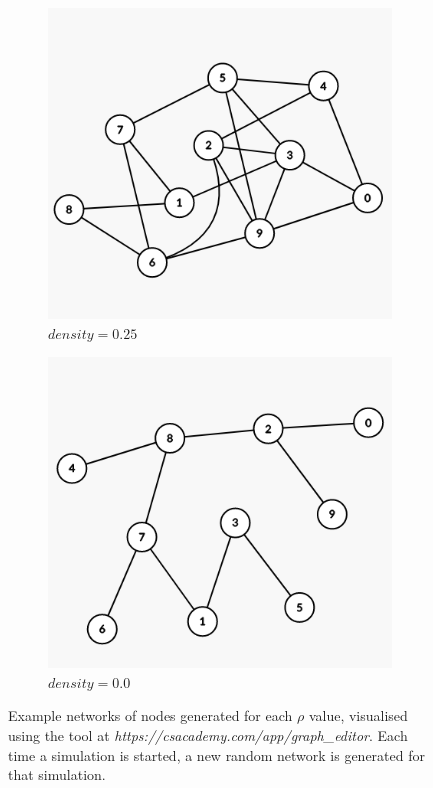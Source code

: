 \documentclass[letterpaper, 10 pt, conference]{ieeeconf}  %
\begin{document}
\begin{figure}[H]
\begin{subfigure}[b]{0.15\textwidth}
		\includegraphics[width=\textwidth]{sparsegraph25}
		\caption{$density=0.25$}
	\end{subfigure}
	\begin{subfigure}[b]{0.15\textwidth}
		\centering
		\includegraphics[width=\textwidth]{sparsegraph0}
		\caption{$density=0.0$}
	\end{subfigure}
	\caption{Example networks of nodes generated for each $\rho$ value, visualised using the tool at \emph{https://csacademy.com/app/graph\_editor}. Each time a simulation is started, a new random network is generated for that simulation. \label{densefig}}
{}\end{figure}
\end{document}
